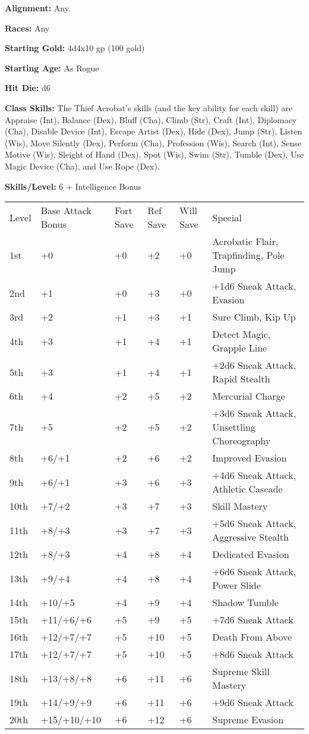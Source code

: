 \documentclass[10pt]{article}
\newcommand{\ability}[2]{\smallskip \noindent \textbf{#1} #2}
\begin{document}
\ability{Alignment:}{Any.}

\ability{Races:}{Any}

\ability{Starting Gold:}{4d4x10 gp (100 gold)}

\ability{Starting Age:}{As Rogue}

\ability{Hit Die:}{d6}

\ability{Class Skills:}{The Thief Acrobat's skills (and the key ability for each skill) are Appraise (Int), Balance (Dex), Bluff (Cha), Climb (Str), Craft (Int), Diplomacy (Cha), Disable Device (Int), Escape Artist (Dex), Hide (Dex), Jump (Str), Listen (Wis), Move Silently (Dex), Perform (Cha), Profession (Wis), Search (Int), Sense Motive (Wis), Sleight of Hand (Dex), Spot (Wis), Swim (Str), Tumble (Dex), Use Magic Device (Cha), and Use Rope (Dex).}

\ability{Skills/Level:}{6 + Intelligence Bonus}

\begin{table}[tbh]
\begin{small}
\begin{tabular}{lp{0.7cm}p{0.7cm}p{0.7cm}p{0.7cm}l}
Level  &Base Attack  Bonus &Fort Save &Ref Save &Will Save &Special\\
1st &+0 &+0 &+2 &+0 &Acrobatic Flair, Trapfinding, Pole Jump\\
2nd &+1 &+0 &+3 &+0 &+1d6 Sneak Attack, Evasion\\
3rd &+2 &+1 &+3 &+1 &Sure Climb, Kip Up\\
4th &+3 &+1 &+4 &+1 &Detect Magic, Grapple Line\\
5th &+3 &+1 &+4 &+1 &+2d6 Sneak Attack, Rapid Stealth\\
6th &+4 &+2 &+5 &+2 &Mercurial Charge\\
7th &+5 &+2 &+5 &+2 &+3d6 Sneak Attack, Unsettling Choreography\\
8th &+6/+1 &+2 &+6 &+2 &Improved Evasion\\
9th &+6/+1 &+3 &+6 &+3 &+4d6 Sneak Attack, Athletic Cascade\\
10th &+7/+2 &+3 &+7 &+3 &Skill Mastery\\
11th &+8/+3 &+3 &+7 &+3 &+5d6 Sneak Attack, Aggressive Stealth\\
12th &+8/+3 &+4 &+8 &+4 &Dedicated Evasion\\
13th &+9/+4 &+4 &+8 &+4 &+6d6 Sneak Attack, Power Slide\\
14th &+10/+5 &+4 &+9 &+4 &Shadow Tumble\\
15th &+11/+6/+6 &+5 &+9 &+5 &+7d6 Sneak Attack\\
16th &+12/+7/+7 &+5 &+10 &+5 &Death From Above\\
17th &+12/+7/+7 &+5 &+10 &+5 &+8d6 Sneak Attack\\
18th &+13/+8/+8 &+6 &+11 &+6 &Supreme Skill Mastery\\
19th &+14/+9/+9 &+6 &+11 &+6 &+9d6 Sneak Attack\\
20th &+15/+10/+10 &+6 &+12 &+6 &Supreme Evasion\\
\end{tabular}
\end{small}
\end{table}
\end{document}
